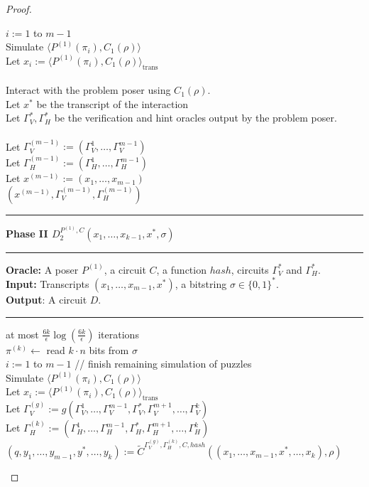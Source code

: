\begin{proof}
\begin{codeblock}
  \For $i:=1$ to $m-1$ \Do \\
  \IndI Simulate $\langle P^{(1)}(\pi_i), C_1(\rho)\rangle$ \\
  \IndI Let $ x_i := \langle P^{(1)}(\pi_i), C_1(\rho)\rangle_{\text{trans}}$ \\ \\
  Interact with the problem poser using $C_1(\rho)$. \\
  \IndI Let $x^*$ be the transcript of the interaction \\
  \IndI Let $\Gamma_V^*, \Gamma_H^*$ be the verification and hint oracles output by the problem poser. \\
  \\
  Let $\Gamma_V^{(m-1)} := (\Gamma_V^{1}, \dots, \Gamma_V^{m-1})$ \\
  Let $\Gamma_H^{(m-1)} := (\Gamma_H^{1}, \dots, \Gamma_H^{m-1})$ \\
  Let $x^{(m-1)} := (x_1, \dots, x_{m-1})$ \\
  \return $\left(x^{(m-1)}, \Gamma_V^{(m-1)}, \Gamma_H^{(m-1)}\right)$
  \medskip \hrule \medskip
  \textbf{Phase II $D_2^{P^{(1)}, C}(x_1, \dots, x_{k-1}, x^*, \sigma)$}
  \medskip \hrule \medskip
  \textbf{Oracle:} A poser $P^{(1)}$, a circuit $C$, a function $hash$, circuits $\Gamma_V^{*}$ and $\Gamma_H^{*}$. \\
  \textbf{Input:} Transcripts $(x_1, \dots, x_{m-1}, x^*)$, a bitstring $\sigma \in \{0,1\}^{*}$.\\
  \textbf{Output}: A circuit $D$.
  \medskip \hrule \medskip
  \For at most $\frac{6k}{\epsilon} \log(\frac{6k}{\epsilon})$ iterations \Do \\
  \IndI $\pi^{(k)} \leftarrow$ read $k\cdot n$ bits from $\sigma$ \\
  \IndI \For $i:=1$ to $m-1$ \Do \IndII // finish remaining simulation of puzzles\\
  \IndII Simulate $\langle P^{(1)}(\pi_i), C_1(\rho)\rangle$ \\
  \IndII Let $ x_i := \langle P^{(1)}(\pi_i), C_1(\rho)\rangle_{\text{trans}}$ \\
  \IndI Let $\Gamma_V^{(g)} := g(\Gamma_V^{1}, \dots, \Gamma_V^{m-1}, \Gamma_V^{*}, \Gamma_V^{m+1}, \dots, \Gamma_V^{k})$  \\
  \IndI Let $\Gamma_H^{(k)} := (\Gamma_H^{1}, \dots, \Gamma_H^{m-1}, \Gamma_H^{*}, \Gamma_H^{m+1}, \dots, \Gamma_H^{k})$ \\
  \IndI $(q,y_1, \dots, y_{m-1}, y^*, \dots, y_k) := \widetilde{C}^{\Gamma_V^{(g)}, \Gamma_H^{(k)}, C, hash}((x_1, \dots, x_{m-1}, x^*, \dots, x_k), \rho)$\\

\end{codeblock}
\end{proof}
